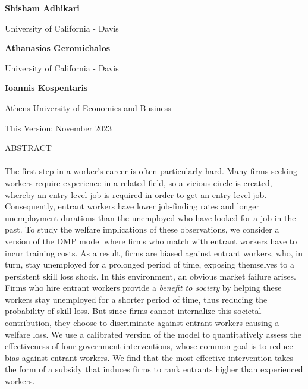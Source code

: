 \documentclass[12pt]{article} %
\theoremstyle{definition}
\begin{document}



\vspace{0.6cm}

\noindent \normalsize  \textbf{Shisham Adhikari}

\noindent University of California - Davis

\vspace{0.5cm}

\noindent \normalsize  \textbf{Athanasios Geromichalos}

\noindent University of California - Davis

\vspace{0.5cm}

\noindent  \textbf{Ioannis Kospentaris}

\noindent Athens University of Economics and Business


\vspace{0.5cm}
\noindent This Version: November 2023





\vspace{0.7cm}




\normalsize

\noindent ABSTRACT------------------------------------------------------------------------------------------------------
\noindent The first step in a worker's career is often particularly hard. Many firms seeking workers require experience in a related field, so a vicious circle is created, whereby an entry level job is required in order to get an entry level job. Consequently, entrant workers have lower job-finding rates and longer unemployment durations than the unemployed who have looked for a job in the past. To study the welfare implications of these observations, we consider a version of the DMP model where firms who match with entrant workers have to incur training costs. As a result, firms are biased against entrant workers, who, in turn, stay unemployed for a prolonged period of time, exposing themselves to a persistent skill loss shock. In this environment, an obvious market failure arises. Firms who hire entrant workers provide a \textit{benefit to society} by helping these workers stay unemployed for a shorter period of time, thus reducing the probability of skill loss. But since firms cannot internalize this societal contribution, they choose to discriminate against entrant workers causing a welfare loss. We use a calibrated version of the model to quantitatively assess the effectiveness of four government interventions, whose common goal is to reduce bias against entrant workers. We find that the most effective intervention takes the form of a subsidy that induces firms to rank entrants higher than experienced workers.
\end{document}
